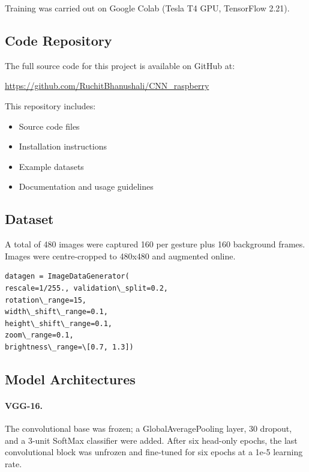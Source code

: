 \documentclass[a4paper,12pt]{article}
\begin{document}
Training was carried out on Google Colab (Tesla T4 GPU, TensorFlow 2.21).

\subsection{Code Repository}
The full source code for this project is available on GitHub at:

\begin{center}
\url{https://github.com/RuchitBhanushali/CNN_raspberry}
\end{center}

This repository includes:
\begin{itemize}
    \item Source code files
    \item Installation instructions
    \item Example datasets
    \item Documentation and usage guidelines
\end{itemize}

\subsection{Dataset}
A total of 480 images were captured 160 per gesture plus 160 background frames. Images were centre-cropped to 480x480 and augmented online.

\begin{lstlisting}[caption={Keras data-augmentation settings},
                   label={lst:aug1}]
datagen = ImageDataGenerator(
rescale=1/255., validation\_split=0.2,
rotation\_range=15,
width\_shift\_range=0.1,
height\_shift\_range=0.1,
zoom\_range=0.1,
brightness\_range=\[0.7, 1.3])
\end{lstlisting}

\subsection{Model Architectures}
\paragraph{VGG-16.} The convolutional base was frozen; a GlobalAveragePooling layer, 30 dropout, and a 3-unit SoftMax classifier were added. After six head-only epochs, the last convolutional block was unfrozen and fine-tuned for six epochs at a 1e-5 learning rate.
\end{document}

